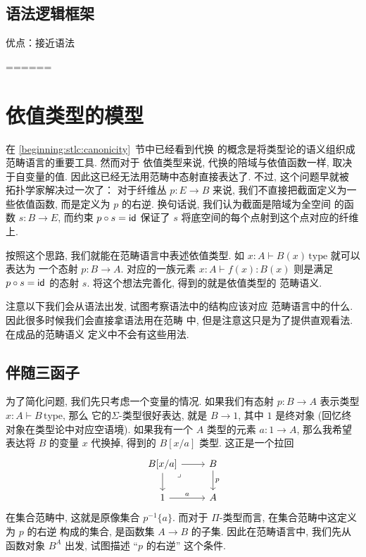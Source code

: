 \subsection{语法逻辑框架}

优点：接近语法

======

\section{依值类型的模型}

在 \ref{beginning:stlc:canonicity}~节中已经看到代换
的概念是将类型论的语义组织成范畴语言的重要工具. 然而对于
依值类型来说, 代换的陪域与依值函数一样, 取决于自变量的值.
因此这已经无法用范畴中态射直接表达了. 不过, 这个问题早就被
拓扑学家解决过一次了： 对于纤维丛 \(p : E \to B\)
来说, 我们不直接把截面定义为一些依值函数, 而是定义为
\(p\) 的右逆. 换句话说, 我们认为截面是陪域为全空间
的函数 \(s : B \to E\), 而约束 \(p \circ s = \textnormal{\textsf{id}}\)
保证了 \(s\) 将底空间的每个点射到这个点对应的纤维上.

按照这个思路, 我们就能在范畴语言中表述依值类型. 如
\(x{:}A \vdash B(x)\,\text{type}\) 就可以表达为
一个态射 \(p : B \to A\). 对应的一族元素
\(x{:}A \vdash f(x) : B(x)\) 则是满足 \(p \circ s = \textnormal{\textsf{id}}\)
的态射 \(s\). 将这个想法完善化, 得到的就是依值类型的
范畴语义.

注意以下我们会从语法出发, 试图考察语法中的结构应该对应
范畴语言中的什么. 因此很多时候我们会直接拿语法用在范畴
中, 但是注意这只是为了提供直观看法. 在成品的范畴语义
定义中不会有这些用法.

\subsection{伴随三函子}
为了简化问题, 我们先只考虑一个变量的情况.
如果我们有态射 \(p : B \to A\) 表示类型
\(x{:}A \vdash B\,\text{type}\), 那么
它的\(\Sigma\)-类型很好表达, 就是 \(B \to 1\),
其中 \(1\) 是终对象 (回忆终对象在类型论中对应空语境).
如果我有一个 \(A\) 类型的元素 \(a : 1 \to A\),
那么我希望表达将 \(B\) 的变量 \(x\) 代换掉, 得到的
\(B[x/a]\) 类型. 这正是一个拉回
\[\begin{tikzcd}
  B[x/a] & B \\
  1 & A
  \arrow["a", from=2-1, to=2-2]
  \arrow["p", from=1-2, to=2-2]
  \arrow[from=1-1, to=2-1]
  \arrow[from=1-1, to=1-2]
  \arrow["\lrcorner"{anchor=center, pos=0.125}, draw=none, from=1-1, to=2-2]
\end{tikzcd}\]
在集合范畴中, 这就是原像集合 \(p^{-1}\{a\}\). 而对于
\(\Pi\)-类型而言, 在集合范畴中这定义为 \(p\) 的右逆
构成的集合, 是函数集 \(A \to B\) 的子集. 因此在范畴语言中,
我们先从函数对象 \(B^A\) 出发, 试图描述 “\(p\) 的右逆” 这个条件.

